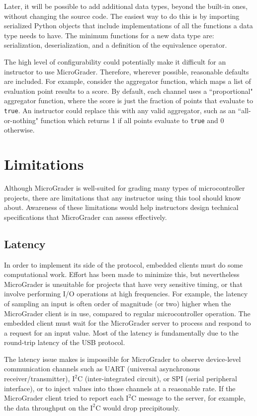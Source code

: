 \documentclass[12pt]{article}
\begin{document}
Later, it will be possible to add additional data types, beyond the built-in ones, without changing the source code.  The easiest way to do this is by importing serialized \cite{pickle} Python objects that include implementations of all the functions a data type needs to have.  The minimum functions for a new data type are: serialization, deserialization, and a definition of the equivalence operator.

The high level of configurability could potentially make it difficult for an instructor to use MicroGrader.  Therefore, wherever possible, reasonable defaults are included.  For example, consider the aggregator function, which maps a list of evaluation point results to a score.  By default, each channel uses a ``proportional" aggregator function, where the score is just the fraction of points that evaluate to \texttt{true}.  An instructor could replace this with any valid aggregator, such as an ``all-or-nothing" function which returns 1 if all points evaluate to \texttt{true} and 0 otherwise.


\clearpage
\section{Limitations}
Although MicroGrader is well-suited for grading many types of microcontroller projects, there are limitations that any instructor using this tool should know about.  Awareness of these limitations would help instructors design technical specifications that MicroGrader can assess effectively.

\subsection{Latency}
In order to implement its side of the protocol, embedded clients must do some computational work.  Effort has been made to minimize this, but nevertheless MicroGrader is unsuitable for projects that have very sensitive timing, or that involve performing I/O operations at high frequencies.  For example, the latency of sampling an input is often order of magnitude (or two) higher when the MicroGrader client is in use, compared to regular microcontroller operation.  The embedded client must wait for the MicroGrader server to process and respond to a request for an input value.  Most of the latency is fundamentally due to the round-trip latency of the USB protocol.

The latency issue makes is impossible for MicroGrader to observe device-level communication channels such as UART (universal asynchronous receiver/transmitter), $\text{I}^2\text{C}$ (inter-integrated circuit), or SPI (serial peripheral interface), or to inject values into those channels at a reasonable rate.  If the MicroGrader client tried to report each $\text{I}^2\text{C}$ message to the server, for example, the data throughput on the $\text{I}^2\text{C}$ would drop precipitously.
\end{document}
